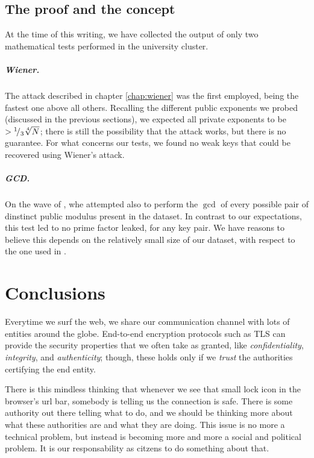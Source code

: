 \section{The proof and the concept}

At the time of this writing, we have collected the output of only two
mathematical tests performed in the university cluster.

\paragraph{Wiener.} The attack described in chapter \ref{chap:wiener} was the
first employed, being the fastest one above all others. Recalling the different
public exponents we probed (discussed in the previous sections), we expected all
private exponents to be $>  {}^{1}\!/_{3}\sqrt[4]{N}$; there is still the
possibility that the attack works, but there is no guarantee.
For what concerns our tests, we found no weak keys that could be recovered using
Wiener's attack.

\paragraph{GCD.} On the wave of \cite{ron:whit}, whe attempted also to perform
the $\gcd$ of every possible pair of dinstinct public modulus present in the
dataset. In contrast to our expectations, this test led to no prime factor
leaked, for any key pair. We have reasons to believe this depends on the
relatively small size of our dataset, with respect to the one used in
\cite{ron:whit}.



\chapter{Conclusions \label{conclusions}}

Everytime we surf the web, we share our communication channel with lots of
entities around the globe. End-to-end encryption protocols such as TLS can
provide the security  properties that we often take as granted, like
\emph{confidentiality}, \emph{integrity}, and \emph{authenticity}; though,
these holds only if we \emph{trust} the authorities certifying the end entity.

There is this mindless thinking that whenever we see that small lock icon in the
browser's url bar, somebody is telling us the connection is safe.
There is some authority out there telling what to do, and we should be thinking
more about what these authorities are and what they are doing.
This issue is no more a technical problem, but instead is becoming more and more
a social and political problem.
It is our responsability as citzens to do something about that.


